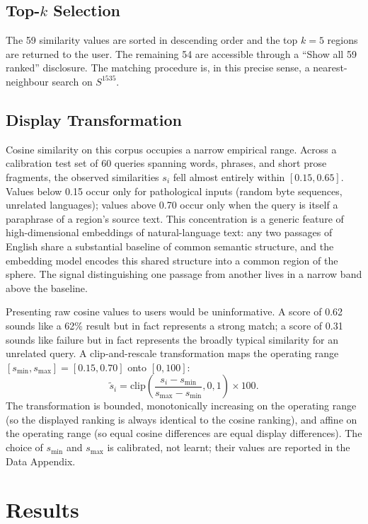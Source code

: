 \documentclass[11pt]{article}
\begin{document}
\subsection{Top-$k$ Selection}
The 59 similarity values are sorted in descending order and the top $k = 5$ regions are returned to the user. The remaining 54 are accessible through a ``Show all 59 ranked'' disclosure. The matching procedure is, in this precise sense, a nearest-neighbour search on $S^{1535}$.

\subsection{Display Transformation}
Cosine similarity on this corpus occupies a narrow empirical range. Across a calibration test set of 60 queries spanning words, phrases, and short prose fragments, the observed similarities $s_i$ fell almost entirely within $[0.15, 0.65]$. Values below 0.15 occur only for pathological inputs (random byte sequences, unrelated languages); values above 0.70 occur only when the query is itself a paraphrase of a region's source text. This concentration is a generic feature of high-dimensional embeddings of natural-language text: any two passages of English share a substantial baseline of common semantic structure, and the embedding model encodes this shared structure into a common region of the sphere. The signal distinguishing one passage from another lives in a narrow band above the baseline.

Presenting raw cosine values to users would be uninformative. A score of 0.62 sounds like a 62\% result but in fact represents a strong match; a score of 0.31 sounds like failure but in fact represents the broadly typical similarity for an unrelated query. A clip-and-rescale transformation maps the operating range $[s_{\min}, s_{\max}] = [0.15, 0.70]$ onto $[0, 100]$:
\[
\tilde{s}_i = \mathrm{clip}\!\left(\frac{s_i - s_{\min}}{s_{\max} - s_{\min}}, 0, 1\right) \times 100.
\]
The transformation is bounded, monotonically increasing on the operating range (so the displayed ranking is always identical to the cosine ranking), and affine on the operating range (so equal cosine differences are equal display differences). The choice of $s_{\min}$ and $s_{\max}$ is calibrated, not learnt; their values are reported in the Data Appendix.

\section{Results}
\end{document}
